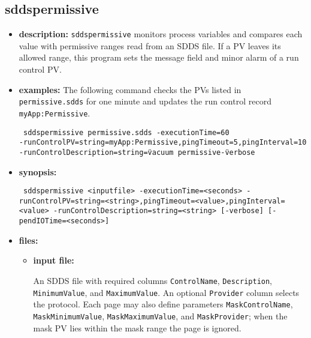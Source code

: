 %
%
\begin{latexonly}
\newpage
\end{latexonly}

\subsection{sddspermissive}
\label{sddspermissive}

\begin{itemize}
\item {\bf description:}
\verb+sddspermissive+ monitors process variables and compares each value with
permissive ranges read from an SDDS file.  If a PV leaves its allowed range,
this program sets the message field and minor alarm of a run control PV.

\item {\bf examples:}
The following command checks the PVs listed in \verb+permissive.sdds+ for one
minute and updates the run control record \verb+myApp:Permissive+.
\begin{flushleft}{\tt
sddspermissive permissive.sdds -executionTime=60\\
  -runControlPV=string=myApp:Permissive,pingTimeout=5,pingInterval=10\\
  -runControlDescription=string=\"vacuum permissive\" -verbose
}\end{flushleft}

\item {\bf synopsis:}
\begin{flushleft}{\tt
sddspermissive <inputfile>\
 -executionTime=<seconds>\
 -runControlPV=string=<string>,pingTimeout=<value>,pingInterval=<value>\
 -runControlDescription=string=<string>\
[-verbose] [-pendIOTime=<seconds>]
}\end{flushleft}

\item {\bf files:}
\begin{itemize}
\item {\bf input file:}\par
An SDDS file with required columns \verb+ControlName+, \verb+Description+,
\verb+MinimumValue+, and \verb+MaximumValue+.  An optional \verb+Provider+
column selects the protocol.  Each page may also define parameters
\verb+MaskControlName+, \verb+MaskMinimumValue+, \verb+MaskMaximumValue+,
and \verb+MaskProvider+; when the mask PV lies within the mask range the page
is ignored.
\end{itemize}


\end{itemize}
